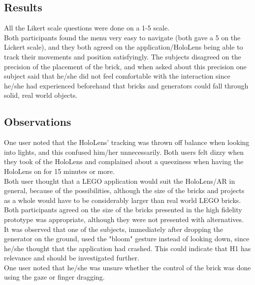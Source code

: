 \subsection{Results}
All the Likert scale questions were done on a 1-5 scale.\\
Both participants found the menu very easy to navigate (both gave a 5 on the Lickert scale), and they both agreed on the application/HoloLens being able to track their movements and position satisfyingly. The subjects disagreed on the precision of the placement of the brick, and when asked about this precision one subject said that he/she did not feel comfortable with the interaction since he/she had experienced beforehand that bricks and generators could fall through solid, real world objects.\\

\subsection{Observations}
One user noted that the HoloLens' tracking was thrown off balance when looking into lights, and this confused him/her unnecessarily. Both users felt dizzy when they took of the HoloLens and complained about a queeziness when having the HoloLens on for 15 minutes or more.\\
Both user thought that a LEGO application would suit the HoloLens/AR in general, because of the possibilities, although the size of the bricks and projects as a whole would have to be considerably larger than real world LEGO bricks. Both participants agreed on the size of the bricks presented in the high fidelity prototype was appropriate, although they were not presented with alternatives.\\
It was observed that one of the subjects, immediately after dropping the generator on the ground, used the "bloom" gesture instead of looking down, since he/she thought that the application had crashed. This could indicate that H1 has relevance and should be investigated further.\\
One user noted that he/she was unsure whether the control of the brick was done using the gaze or finger dragging.